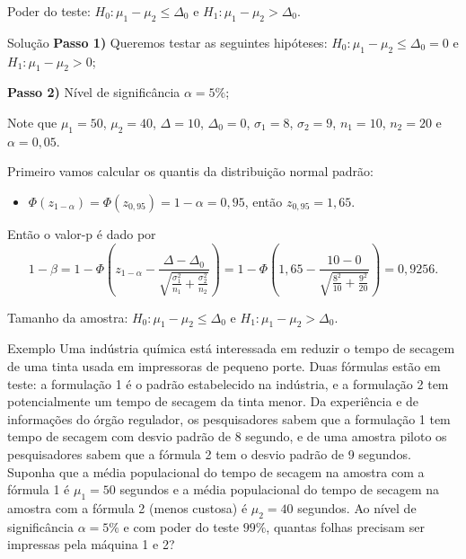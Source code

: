 \documentclass[9pt]{beamer}
\begin{document}
\begin{frame}{Poder do teste: $H_0:\mu_1 - \mu_2 \leq \Delta_0$ e $H_1: \mu_1 - \mu_2 > \Delta_0$.}

\begin{block}{Solução}
	\textbf{Passo 1)} Queremos testar as seguintes hipóteses: $H_0: \mu_1 - \mu_2 \leq \Delta_0 = 0$ e $H_1: \mu_1 - \mu_2 > 0$;
	
	\textbf{Passo 2)} Nível de significância $\alpha=5\%$;
	
	Note que $\mu_1=50$, $\mu_2=40$, $\Delta=10$, $\Delta_0=0$, $\sigma_1=8$, $\sigma_2 = 9$, $n_1=10$, $n_2=20$ e $\alpha = 0,05$.
	
	Primeiro vamos calcular os quantis da distribuição normal padrão:
	\begin{itemize}
		\item $\Phi\left( z_{1-\alpha} \right) = \Phi\left( z_{0,95} \right) = 1-\alpha = 0,95$, então $z_{0,95} = 1,65$.
	\end{itemize}
	
	Então o valor-p é dado por
	$$1-\beta=1 - \Phi\left( z_{1-\alpha} - \frac{\Delta - \Delta_0}{ \sqrt{ \frac{\sigma_1^2}{n_1} + \frac{\sigma_2^2}{n_2} }} \right) = 1 - \Phi\left( 1,65 - \frac{10 - 0}{ \sqrt{ \frac{8^2}{10} + \frac{9^2}{20} }} \right) = 0,9256.$$
\end{block}

\end{frame}

\begin{frame}{Tamanho da amostra: $H_0:\mu_1 - \mu_2 \leq \Delta_0$ e $H_1: \mu_1 - \mu_2 > \Delta_0$.}

\begin{block}{Exemplo}
	Uma indústria química está interessada em reduzir o tempo de secagem de uma tinta usada em impressoras de pequeno porte. Duas fórmulas estão em teste: a formulação 1 é o padrão estabelecido na indústria, e a formulação 2 tem potencialmente um tempo de secagem da tinta menor. Da experiência e de informações do órgão regulador, os pesquisadores sabem que a formulação 1 tem tempo de secagem com desvio padrão de 8 segundo, e de uma amostra piloto os pesquisadores sabem que a fórmula 2 tem o desvio padrão de 9 segundos. 
	Suponha que a média populacional do tempo de secagem na amostra com a fórmula 1 é $\mu_1 = 50$ segundos e a média populacional do tempo de secagem na amostra com a fórmula 2 (menos custosa) é $\mu_2 = 40$ segundos. Ao nível de significância $\alpha=5\%$ e com poder do teste $99\%$, quantas folhas precisam ser impressas pela máquina 1 e 2?
\end{block}

\end{frame}
\end{document}
